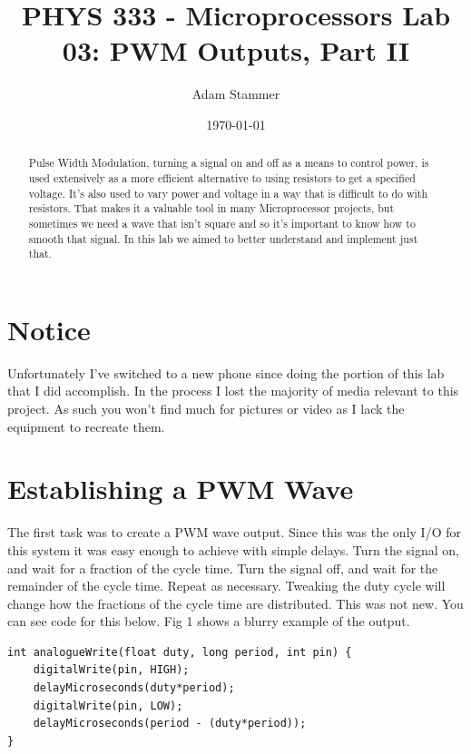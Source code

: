 \documentclass[prb,preprint]{revtex4-1}
\begin{document}
\title{PHYS 333 - Microprocessors Lab 03: PWM Outputs, Part II}
\author{Adam Stammer}

\date{\today}

\begin{abstract}
Pulse Width Modulation, turning a signal on and off as a means to control power, is used extensively as a more efficient alternative to using resistors to get a specified voltage. It's also used to vary power and voltage in a way that is difficult to do with resistors. That makes it a valuable tool in many Microprocessor projects, but sometimes we need a wave that isn't square and so it's important to know how to smooth that signal. In this lab we aimed to better understand and implement just that.
\end{abstract}

\maketitle

\section{Notice}
Unfortunately I've switched to a new phone since doing the portion of this lab that I did accomplish. In the process I lost the majority of media relevant to this project. As such you won't find much for pictures or video as I lack the equipment to recreate them.


\section{Establishing a PWM Wave}
The first task was to create a PWM wave output. Since this was the only I/O for this system it was easy enough to achieve with simple delays. Turn the signal on, and wait for a fraction of the cycle time. Turn the signal off, and wait for the remainder of the cycle time. Repeat as necessary. Tweaking the duty cycle will change how the fractions of the cycle time are distributed. This was not new. You can see code for this below. Fig 1 shows a blurry example of the output.

\begin{verbatim}
int analogueWrite(float duty, long period, int pin) {
    digitalWrite(pin, HIGH);
    delayMicroseconds(duty*period);
    digitalWrite(pin, LOW);
    delayMicroseconds(period - (duty*period));
}
\end{verbatim}
\end{document}
